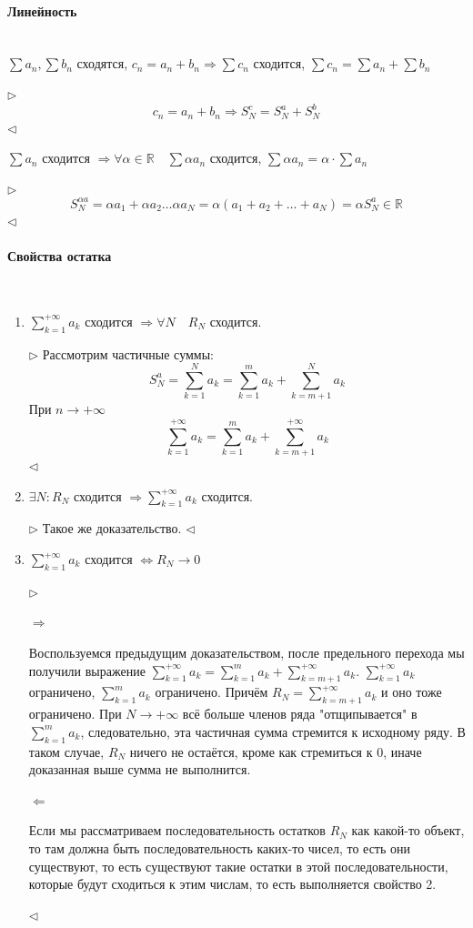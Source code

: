 \documentclass{article}
\let\vanillaparagraph\paragraph
\renewcommand{\paragraph}[1]{\vanillaparagraph{#1}\mbox{}\\}
\begin{document}
\paragraph{Линейность}
$\sum a_n, \sum b_n$ сходятся, $c_n = a_n + b_n \Rightarrow \sum c_n$ сходится, $\sum c_n = \sum a_n + \sum b_n$

$\rhd$
$$
c_n = a_n + b_n \Rightarrow S_N^c = S_N^a + S_N^b
$$
$\lhd$

$\sum a_n$ сходится $\Rightarrow \forall \alpha \in \mathbb{R} \quad \sum \alpha a_n$ сходится, $\sum \alpha a_n = \alpha \cdot \sum a_n$

$\rhd$
$$
S_N^{\alpha a} = \alpha a_1 + \alpha a_2 \ldots \alpha a_N = \alpha (a_1 + a_2 + \ldots + a_N) = \alpha S_N^a \in \mathbb{R}
$$
$\lhd$
\paragraph{Свойства остатка}
\begin{enumerate}
    \item $\sum_{k=1}^{+\infty} a_k$ сходится $\Rightarrow \forall N \quad R_N$ сходится.
    
    $\rhd$
    Рассмотрим частичные суммы:
    $$
    S_N^a = \sum_{k=1}^N a_k = \sum_{k=1}^m a_k + \sum_{k=m+1}^N a_k
    $$
    При $n \rightarrow +\infty$
    $$
    \sum_{k=1}^{+\infty} a_k = \sum_{k=1}^m a_k + \sum_{k=m+1}^{+\infty} a_k
    $$
    $\lhd$
    
    \item $\exists N : R_N$ сходится $\Rightarrow \sum_{k=1}^{+\infty} a_k$ сходится.
    
    $\rhd$
    Такое же доказательство.
    $\lhd$
    
    \item $\sum_{k=1}^{+\infty} a_k$ сходится $\Leftrightarrow R_N \rightarrow 0$
    
    $\rhd$
    
    $\Rightarrow$

    Воспользуемся предыдущим доказательством, после предельного перехода мы получили выражение $\sum_{k=1}^{+\infty} a_k = \sum_{k=1}^m a_k + \sum_{k=m+1}^{+\infty} a_k$. $\sum_{k=1}^{+\infty} a_k$ ограничено, $\sum_{k=1}^m a_k$ ограничено. Причём $R_N = \sum_{k=m+1}^{+\infty} a_k$ и оно тоже ограничено. При $N \rightarrow +\infty$ всё больше членов ряда "отщипывается" в $\sum_{k=1}^m a_k$, следовательно, эта частичная сумма стремится к исходному ряду. В таком случае, $R_N$ ничего не остаётся, кроме как стремиться к 0, иначе доказанная выше сумма не выполнится.

    $\Leftarrow$
    
    Если мы рассматриваем последовательность остатков $R_N$ как какой-то объект, то там должна быть последовательность каких-то чисел, то есть они существуют, то есть существуют такие остатки в этой последовательности, которые будут сходиться к этим числам, то есть выполняется свойство 2.
    
    $\lhd$
\end{enumerate}
\end{document}
